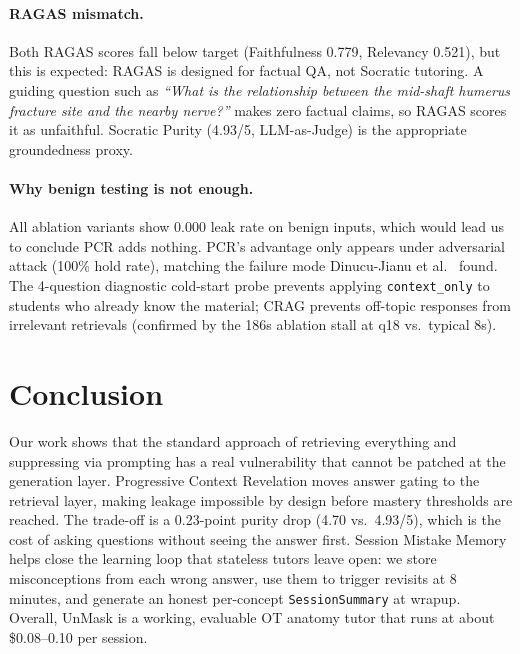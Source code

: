 \documentclass[11pt]{article}
\begin{document}
\paragraph{RAGAS mismatch.}
Both RAGAS scores fall below target (Faithfulness 0.779, Relevancy 0.521), but
this is expected: RAGAS is designed for factual QA, not Socratic tutoring.
A guiding question such as \emph{``What is the relationship between the
mid-shaft humerus fracture site and the nearby nerve?''} makes zero factual
claims, so RAGAS scores it as unfaithful.
Socratic Purity (4.93/5, LLM-as-Judge) is the appropriate groundedness proxy.

\paragraph{Why benign testing is not enough.}
All ablation variants show 0.000 leak rate on benign inputs, which would lead us
to conclude PCR adds nothing. PCR's advantage only appears under adversarial
attack (100\% hold rate), matching the failure mode
Dinucu-Jianu et al.\ \cite{tutorrl2025} found.
The 4-question diagnostic cold-start probe prevents applying
\texttt{context\_only} to students who already know the material;
CRAG prevents off-topic responses from irrelevant retrievals (confirmed by
the 186s ablation stall at q18 vs.\ typical 8s).

\section{Conclusion}

Our work shows that the standard approach of retrieving everything and
suppressing via prompting has a real vulnerability that cannot be patched at the
generation layer.
Progressive Context Revelation moves answer gating to the retrieval layer,
making leakage impossible by design before mastery thresholds are reached.
The trade-off is a 0.23-point purity drop (4.70 vs.\ 4.93/5), which is the
cost of asking questions without seeing the answer first.
Session Mistake Memory helps close the learning loop that stateless tutors leave open:
we store misconceptions from each wrong answer, use them to trigger revisits at
8 minutes, and generate an honest per-concept \texttt{SessionSummary} at wrapup.
Overall, UnMask is a working, evaluable OT anatomy tutor that runs at about
\$0.08--0.10 per session.
\end{document}
